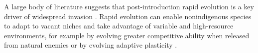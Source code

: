 \documentclass[12pt]{article}\usepackage[]{graphicx}\usepackage[]{color}
\begin{document}
	A large body of literature suggests that post-introduction rapid evolution is a key driver of widespread invasion  \parencite[e.g.,][]{Reznick2001, Prentis2008,Colautti2015,Lee2002invasion,Clements2011}.  Rapid evolution can enable nonindigenous species to adapt to vacant niches and take advantage of variable and high-resource environments, for example by evolving greater competitive ability  when released from natural enemies \parencite{Blossey1995,Bossdorf2005} or by evolving adaptive plasticity \parencite{Richards2006}. %
	
\end{document}

